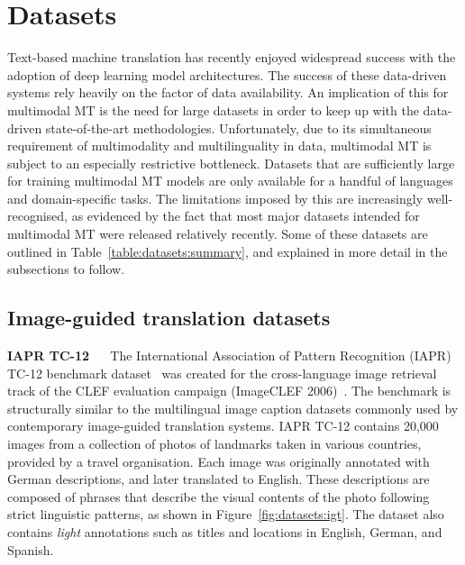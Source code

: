 \documentclass{svjour3}
\newcommand{\element}[1]{\noindent\textbf{#1} ~~}
\begin{document}
\section{Datasets}
\label{sec:datasets}
    Text-based machine translation has recently enjoyed widespread success with the adoption of deep learning model architectures. The success of these data-driven systems rely heavily on the factor of data availability. An implication of this for multimodal MT is the need for large datasets in order to keep up with the data-driven state-of-the-art methodologies. Unfortunately, due to its simultaneous requirement of multimodality and multilinguality in data, multimodal MT is subject to an especially restrictive bottleneck. Datasets that are sufficiently large for training multimodal MT models are only available for a handful of languages and domain-specific tasks. The limitations imposed by this are increasingly well-recognised, as evidenced by the fact that most major datasets intended for multimodal MT were released relatively recently. Some of these datasets are outlined in Table~\ref{table:datasets:summary}, and explained in more detail in the subsections to follow.



    \subsection{Image-guided translation datasets}
    \label{sec:datasets:ict}
        


        \element{IAPR TC-12}
            The International Association of Pattern Recognition (IAPR) TC-12 benchmark dataset~\citep{grubinger-iapr-2006} was created for the cross-language image retrieval track of the CLEF evaluation campaign (ImageCLEF 2006)~\citep{clough-overview-2006}. The benchmark is structurally similar to the multilingual image caption datasets commonly used by contemporary image-guided translation systems. IAPR TC-12 contains 20,000 images from a collection of photos of landmarks taken in various countries, provided by a travel organisation. Each image was originally annotated with German descriptions, and later translated to English. These descriptions are composed of phrases that describe the visual contents of the photo following strict linguistic patterns, as shown in Figure~\ref{fig:datasets:igt}. The dataset also contains \textit{light} annotations such as titles and locations in English, German, and Spanish. \\
        
\end{document}

